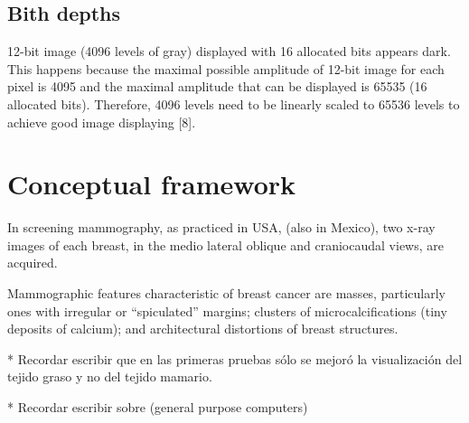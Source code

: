 \subsection{Bith depths}

12-bit image (4096 levels of gray) displayed with 16 allocated bits appears
dark. This happens because the maximal possible amplitude of 12-bit image for
each pixel is 4095 and the maximal amplitude that can be displayed is 65535 (16
allocated bits). Therefore, 4096 levels need to be linearly scaled to 65536
levels to achieve good image displaying [8].

\section{Conceptual framework}

In screening mammography, as practiced in
USA, (also in Mexico), two x-ray images of each breast, in the medio lateral
oblique and craniocaudal views, are acquired. 

Mammographic features characteristic of breast cancer are masses, particularly
ones with irregular or “spiculated” margins; clusters of microcalcifications
(tiny deposits of calcium); and architectural distortions of breast structures. 

* Recordar escribir que en las primeras pruebas sólo se mejoró  la
visualización del tejido graso y no del tejido mamario.

* Recordar escribir sobre (general purpose computers)

